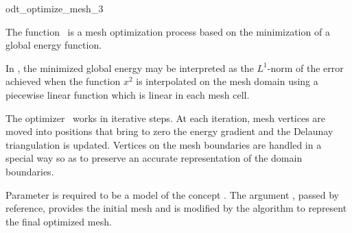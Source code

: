 \ccRefPageBegin


\begin{ccRefFunction}{odt_optimize_mesh_3}  %


\ccDefinition
  
The function \ccRefName\ is a mesh optimization process
based on the minimization of a global energy function.

In \ccRefName, the minimized global energy may be interpreted
as the $L^1$-norm of the error achieved 
when  the function $x^2$ is interpolated on the  mesh domain
using a piecewise linear function which is linear  in each mesh cell.

The optimizer \ccRefName\  works in iterative steps.
At each iteration,  mesh vertices are moved into 
positions that bring to zero the energy gradient
and the Delaunay triangulation is updated.
Vertices on the mesh boundaries are handled
in a special way so as to preserve an accurate
representation of the domain boundaries.




\ccParameters

Parameter  is required to be a model of the concept
.
The argument , passed by
reference, provides the initial mesh  
and is modified  by the algorithm 
to represent the final optimized mesh.


\end{ccRefFunction}
